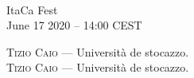 \documentclass{article}
\makeatletter
\def\fsize#1#2{\fontsize{#1}{#1}\selectfont #2}
\newcommand{\talk}[3]{
  {\textsc{#1}} --- #2. \textit{#3}
} %
\makeatother
\begin{document}
\begin{flushright}
  \hrulefill\\[2mm]
  \noindent\fsize{40}{ItaCa Fest}\\[5mm]
  \fsize{25}{June 17 2020 -- 14:00 CEST}\\[5mm]
\end{flushright}

\large
\talk{Tizio Caio}{Università de stocazzo}{\lipsum[2]}\\[2em]

\talk{Tizio Caio}{Università de stocazzo}{\lipsum[2]}
\end{document}

